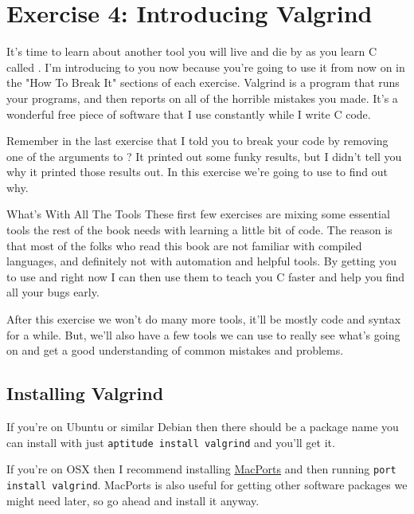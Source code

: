 \chapter{Exercise 4: Introducing Valgrind}

It's time to learn about another tool you will live and die by as you
learn C called .  I'm introducing  to you
now because you're going to use it from now on in the "How To Break It"
sections of each exercise.  Valgrind is a program that runs your programs,
and then reports on all of the horrible mistakes you made.  It's a wonderful
free piece of software that I use constantly while I write C code.

Remember in the last exercise that I told you to break your code by
removing one of the arguments to ?  It printed out some
funky results, but I didn't tell you why it printed those results out.
In this exercise we're going to use  to find out 
why.

\begin{aside}{What's With All The Tools}
These first few exercises are mixing some essential tools the rest
of the book needs with learning a little bit of code.  The reason is
that most of the folks who read this book are not familiar with compiled
languages, and definitely not with automation and helpful tools.  By 
getting you to use  and  right now I can
then use them to teach you C faster and help you find all your bugs
early.

After this exercise we won't do many more tools, it'll be mostly
code and syntax for a while.  But, we'll also have a few tools we
can use to really see what's going on and get a good understanding
of common mistakes and problems.
\end{aside}

\section{Installing Valgrind}

If you're on Ubuntu or similar Debian then there should be a package
name  you can install with just \verb|aptitude install valgrind|
and you'll get it.

If you're on OSX then I recommend installing \href{http://www.macports.org/}{MacPorts}
and then running \verb|port install valgrind|.  MacPorts is also useful for
getting other software packages we might need later, so go ahead and install 
it anyway.

